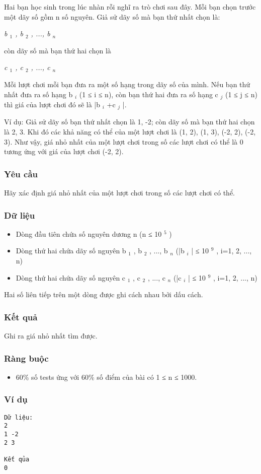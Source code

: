 

Hai bạn học sinh trong lúc nhàn rỗi nghĩ ra trò chơi sau đây. Mỗi bạn chọn trước một dãy số gồm n số nguyên. Giả sử dãy số mà bạn thứ nhất chọn là:

\emph{b $_ 1 $ , b $_ 2 $ , ..., b $_ n $}

còn dãy số mà bạn thứ hai chọn là

\emph{c $_ 1 $ , c $_ 2 $ , ..., c $_ n $}

Mỗi lượt chơi mỗi bạn đưa ra một số hạng trong dãy số của mình. Nếu bạn thứ nhất đưa ra số hạng b $_ i $ (1 ≤ i ≤ n), còn bạn thứ hai đưa ra số hạng c $_ j $ (1 ≤ j ≤ n) thì giá của lượt chơi đó sẽ là |b $_ i $ +c $_ j $ |.

Ví dụ: Giả sử dãy số bạn thứ nhất chọn là 1, -2; còn dãy số mà bạn thứ hai chọn là 2, 3. Khi đó các khả năng có thể của một lượt chơi là (1, 2), (1, 3), (-2, 2), (-2, 3). Như vậy, giá nhỏ nhất của một lượt chơi trong số các lượt chơi có thể là 0 tương ứng với giá của lượt chơi (-2, 2).

\subsubsection{Yêu cầu}

Hãy xác định giá nhỏ nhất của một lượt chơi trong số các lượt chơi có thể.

\subsubsection{Dữ liệu}
\begin{itemize}
	\item Dòng đầu tiên chứa số nguyên dương n (n ≤ 10 $^ 5 $ )
	\item Dòng thứ hai chứa dãy số nguyên b $_ 1 $ , b $_ 2 $ , ..., b $_ n $ (|b $_ i $ | ≤ 10 $^ 9 $ , i=1, 2, ..., n)
	\item Dòng thứ hai chứa dãy số nguyên c $_ 1 $ , c $_ 2 $ , ..., c $_ n $ (|c $_ i $ | ≤ 10 $^ 9 $ , i=1, 2, ..., n)
\end{itemize}

Hai số liên tiếp trên một dòng được ghi cách nhau bởi dấu cách.

\subsubsection{Kết quả}

Ghi ra giá nhỏ nhất tìm được.

\subsubsection{Ràng buộc}
\begin{itemize}
	\item 60\% số tests ứng với 60\% số điểm của bài có 1 ≤ n ≤ 1000.
\end{itemize}

\subsubsection{Ví dụ}
\begin{verbatim}
Dữ liệu:
2
1 -2
2 3

Kết qủa
0
\end{verbatim}